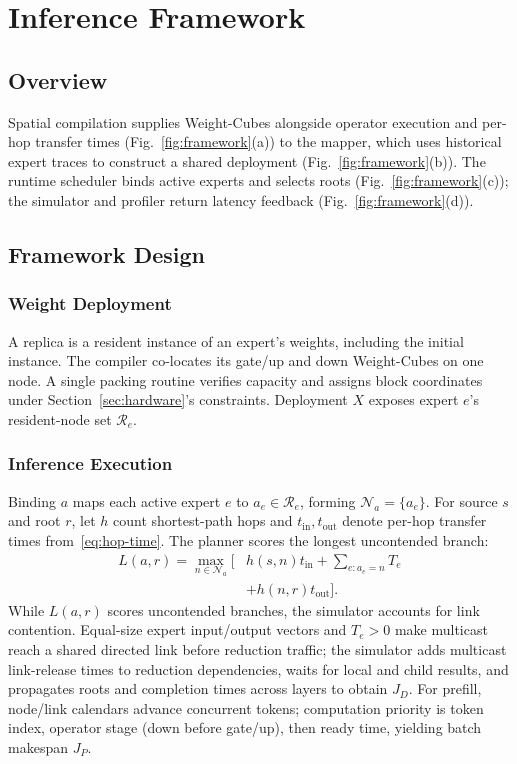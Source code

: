 \section{Inference Framework}
\label{sec:framework}


\subsection{Overview}

Spatial compilation supplies Weight-Cubes alongside operator execution and per-hop transfer times (Fig.~\ref{fig:framework}(a)) to the mapper, which uses historical expert traces to construct a shared deployment (Fig.~\ref{fig:framework}(b)). The runtime scheduler binds active experts and selects roots (Fig.~\ref{fig:framework}(c)); the simulator and profiler return latency feedback (Fig.~\ref{fig:framework}(d)).

\subsection{Framework Design}

\subsubsection{Weight Deployment}
A replica is a resident instance of an expert's weights, including the initial instance. The compiler co-locates its gate/up and down Weight-Cubes on one node. A single packing routine verifies capacity and assigns block coordinates under Section~\ref{sec:hardware}'s constraints. Deployment $X$ exposes expert $e$'s resident-node set $\mathcal{R}_e$.

\subsubsection{Inference Execution}
Binding $a$ maps each active expert $e$ to $a_e\in\mathcal{R}_e$, forming $\mathcal{N}_a=\{a_e\}$. For source $s$ and root $r$, let $h$ count shortest-path hops and $t_{\mathrm{in}},t_{\mathrm{out}}$ denote per-hop transfer times from~\eqref{eq:hop-time}. The planner scores the longest uncontended branch:
\begin{equation}
  \begin{aligned}
    L(a,r)=\max_{n\in\mathcal{N}_a}\Big[&h(s,n)t_{\mathrm{in}}
      +\sum_{e:a_e=n}T_e\\
      &+h(n,r)t_{\mathrm{out}}\Big].
  \end{aligned}
  \label{eq:decode-plan}
\end{equation}
While $L(a,r)$ scores uncontended branches, the simulator accounts for link contention. Equal-size expert input/output vectors and $T_e>0$ make multicast reach a shared directed link before reduction traffic; the simulator adds multicast link-release times to reduction dependencies, waits for local and child results, and propagates roots and completion times across layers to obtain $J_D$. For prefill, node/link calendars advance concurrent tokens; computation priority is token index, operator stage (down before gate/up), then ready time, yielding batch makespan $J_P$.

